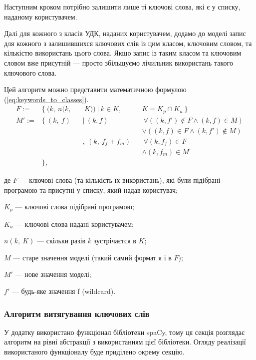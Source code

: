 \documentclass[14pt]{extarticle}
\begin{document}
  Наступним кроком потрібно залишити лише ті ключові слова, які є у списку,
  наданому користувачем.

  Далі для кожного з класів УДК, наданих користувачем,
  додамо до моделі запис для кожного з залишившихся ключових слів із цим класом,
  ключовим словом, та кількістю використань цього слова.
  Якщо запис із таким класом та ключовим словом вже присутній ---
  просто збільшуємо лічильник використань такого ключового слова.

  Цей алгоритм можно представити математичною формулою
    (\ref{eq:keywords_to_classes}).
  \begin{equation}
    \begin{alignedat}{3}
      F := &\{~ (k,~ n(k,&&~ K)) ~|~ k \in K,~ &&K = K_p \cap K_u ~\} \\
      M':= &\{~ (k,~ f)  &&|~ (k, f)          &&~\forall ((k, f') \notin F
           \land   (k, f) \in M) \\
           &             &&                    &&\lor   ((k, f) \in F
           \land   (k, f') \notin M) \\
           &             &&,~ (k,~ f_f + f_m) &&~\forall (k, f_f) \in F \\
           &             &&                    &&\land   (k, f_m) \in M \\
           &\},
    \end{alignedat}
    \label{eq:keywords_to_classes}
  \end{equation}

  де $F$ --- ключові слова (та кількість їх використань),
      які були підібрані програмою та присутні у списку, який надав користувач;

  $K_p$ --- ключові слова підібрані програмою;

  $K_u$ --- ключові слова надані користувачем;

  $n(k,~ K)$ --- скільки разів $k$ зустрічаєтся в $K$;

  $M$ --- старе значення моделі (такий самий формат я і в $F$);

  $M'$ --- нове значення моделі;

  $f'$ --- будь-яке значення f (wildcard).

  \subsubsection{Алгоритм витягування ключових слів}
  У додатку використано функціонал бібліотеки spaCy,
  тому ця секція розглядає алгоритм \cite{wiki_algorithm} на рівні абстракції
  \cite{wiki_abstraction,wiki_abstraction_layer}
  з використанням цієї бібліотеки.
  Огляду реалізації використаного функціоналу буде приділено окрему секцію.
\end{document}
